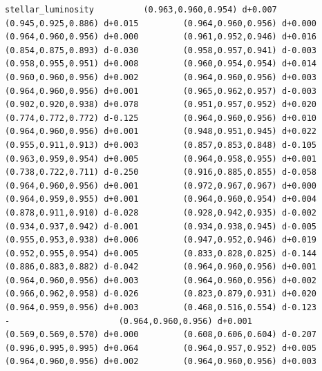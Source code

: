 \documentclass[11pt, letterpaper, openany]{book}
\begin{document}
\begin{empiricalbox}
\begin{lstlisting}[style=terminal]
stellar_luminosity          (0.963,0.960,0.954) d+0.007         (0.945,0.925,0.886) d+0.015         (0.964,0.960,0.956) d+0.000         (0.964,0.960,0.956) d+0.000         (0.961,0.952,0.946) d+0.016         (0.854,0.875,0.893) d-0.030         (0.958,0.957,0.941) d-0.003         (0.958,0.955,0.951) d+0.008         (0.960,0.954,0.954) d+0.014         (0.960,0.960,0.956) d+0.002         (0.964,0.960,0.956) d+0.003         (0.964,0.960,0.956) d+0.001         (0.965,0.962,0.957) d-0.003         (0.902,0.920,0.938) d+0.078         (0.951,0.957,0.952) d+0.020         (0.774,0.772,0.772) d-0.125         (0.964,0.960,0.956) d+0.010         (0.964,0.960,0.956) d+0.001         (0.948,0.951,0.945) d+0.022         (0.955,0.911,0.913) d+0.003         (0.857,0.853,0.848) d-0.105         (0.963,0.959,0.954) d+0.005         (0.964,0.958,0.955) d+0.001         (0.738,0.722,0.711) d-0.250         (0.916,0.885,0.855) d-0.058         (0.964,0.960,0.956) d+0.001         (0.972,0.967,0.967) d+0.000         (0.964,0.959,0.955) d+0.001         (0.964,0.960,0.954) d+0.004         (0.878,0.911,0.910) d-0.028         (0.928,0.942,0.935) d-0.002         (0.934,0.937,0.942) d-0.001         (0.934,0.938,0.945) d-0.005         (0.955,0.953,0.938) d+0.006         (0.947,0.952,0.946) d+0.019         (0.952,0.955,0.954) d+0.005         (0.833,0.828,0.825) d-0.144         (0.886,0.883,0.882) d-0.042         (0.964,0.960,0.956) d+0.001         (0.964,0.960,0.956) d+0.003         (0.964,0.960,0.956) d+0.002         (0.966,0.962,0.958) d-0.026         (0.823,0.879,0.931) d+0.020         (0.964,0.959,0.956) d+0.003         (0.468,0.516,0.554) d-0.123                      -                      (0.964,0.960,0.956) d+0.001         (0.569,0.569,0.570) d+0.000         (0.608,0.606,0.604) d-0.207         (0.996,0.995,0.995) d+0.064         (0.964,0.957,0.952) d+0.005         (0.964,0.960,0.956) d+0.002         (0.964,0.960,0.956) d+0.003     

\end{lstlisting}
\end{empiricalbox}
\end{document}
